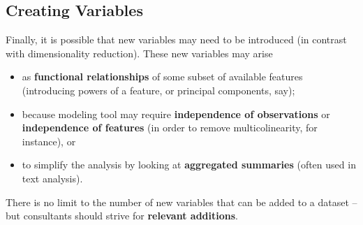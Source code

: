\subsection{Creating Variables} Finally, it is possible that new variables may need to be introduced (in contrast with dimensionality reduction). These new variables may arise
\begin{itemize}[noitemsep]
\item as \textbf{functional relationships} of some subset of available features (introducing powers of a feature, or principal components, say);
\item because modeling tool may require \textbf{independence of observations} or \textbf{independence of features} (in order to remove multicolinearity, for instance), or 
\item to simplify the analysis by looking at \textbf{aggregated summaries} (often used in text analysis).
\end{itemize}
There is no limit to the number of new variables that can be added to a dataset -- but consultants should strive for \textbf{relevant additions}.

